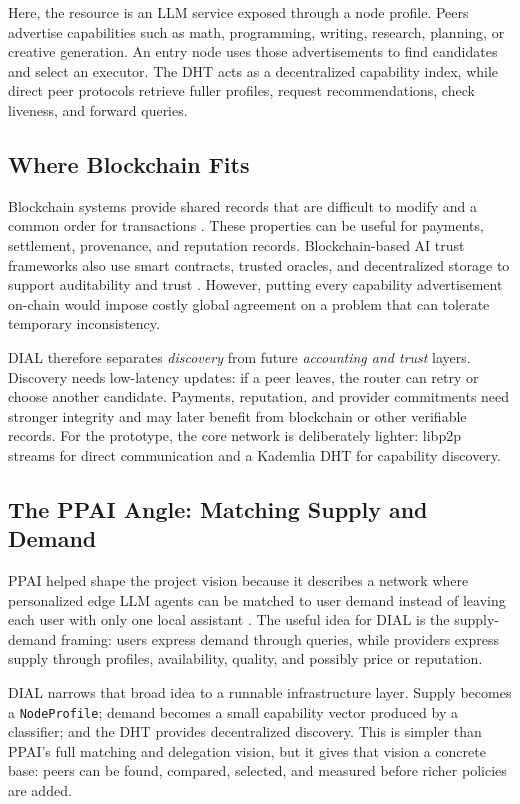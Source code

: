 Here, the resource is an LLM service exposed through a node profile. Peers
advertise capabilities such as math, programming, writing, research, planning,
or creative generation. An entry node uses those advertisements to find
candidates and select an executor. The DHT acts as a decentralized capability
index, while direct peer protocols retrieve fuller profiles, request
recommendations, check liveness, and forward queries.

\subsection{Where Blockchain Fits}

Blockchain systems provide shared records that are difficult to modify and a
common order for transactions \citep{nakamoto2008bitcoin}. These properties
can be useful for payments, settlement, provenance, and reputation records.
Blockchain-based AI trust frameworks also use smart contracts, trusted oracles,
and decentralized storage to support auditability and trust
\citep{nassar2020blockchain}. However, putting every capability advertisement
on-chain would impose costly global agreement on a problem that can tolerate
temporary inconsistency.

DIAL therefore separates \textit{discovery} from future
\textit{accounting and trust} layers. Discovery needs low-latency updates: if a
peer leaves, the router can retry or choose another candidate. Payments,
reputation, and provider commitments need stronger integrity and may later
benefit from blockchain or other verifiable records. For the prototype, the
core network is deliberately lighter: libp2p streams for direct communication
and a Kademlia DHT for capability discovery.

\subsection{The PPAI Angle: Matching Supply and Demand}

PPAI helped shape the project vision because it describes a network where
personalized edge LLM agents can be matched to user demand instead of leaving
each user with only one local assistant \citep{wang2026ppai}. The useful idea
for DIAL is the supply-demand framing: users express demand through queries,
while providers express supply through profiles, availability, quality, and
possibly price or reputation.

DIAL narrows that broad idea to a runnable infrastructure layer. Supply becomes
a \texttt{NodeProfile}; demand becomes a small capability vector produced by a
classifier; and the DHT provides decentralized discovery. This is simpler than
PPAI's full matching and
delegation vision, but it gives that vision a concrete base: peers can be
found, compared, selected, and measured before richer policies are added.

